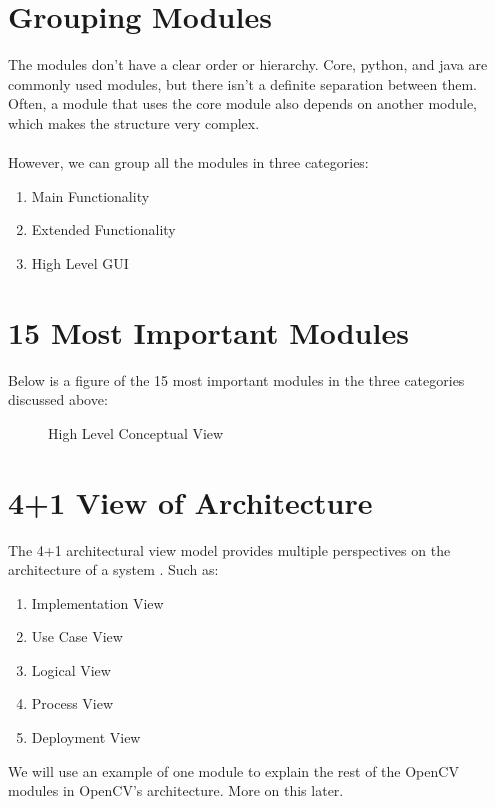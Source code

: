 \section{Grouping Modules\label{Section::GroupingModules}}
The modules don't have a clear order or hierarchy. Core, python, and java are commonly used modules, but there isn't a definite separation between them. Often, a module that uses the core module also depends on another module, which makes the structure very complex.\\\\
However, we can group all the modules in three categories:
\begin{enumerate}
     \item Main Functionality
     \item Extended Functionality
     \item High Level GUI
\end{enumerate}

\section{15 Most Important Modules\label{Section::HighLevelView}}
Below is a figure of the 15 most important modules in the three categories discussed above:
\begin{figure}[H]
     \centering
     \caption{\label{Figure::HighLevelView} High Level Conceptual View}
\end{figure}
\pagebreak

\section{4+1 View of Architecture\label{Section::4+1view}}
The 4+1 architectural view model provides multiple perspectives on the architecture of a system \cite{UNB}. Such as:
\begin{enumerate}
         \item Implementation View
         \item Use Case View
         \item Logical View
         \item Process View
         \item Deployment View
\end{enumerate}
We will use an example of one module to explain the rest of the OpenCV modules in OpenCV’s architecture. More on this later.
